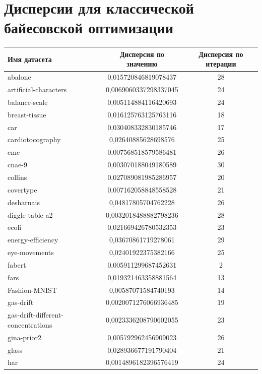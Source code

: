\documentclass[times,specification,annotation]{itmo-student-thesis}
\begin{document}
\chapter{Дисперсии для классической байесовской оптимизации}\label{app:сbo-disp}
\begin{center} 
	\begin{longtable}{ |m{5cm}|c|c| } 
		\hline
		\textbf{Имя датасета} & \textbf{Дисперсия по значению} & \textbf{Дисперсия по итерации} \\
		\hline\hline
		abalone & 0,015720846819078437 & 28 \\
		\hline
		artificial-characters & 0,0069060337298337045 & 24 \\
		\hline
		balance-scale & 0,005114884116420693 & 24 \\
		\hline
		breast-tissue & 0,016125763125763116 & 18 \\
		\hline
		car & 0,030408332830185746 & 17 \\
		\hline
		cardiotocography & 0,02640885628698576 & 25 \\
		\hline
		cmc & 0,007568518579586481 & 26 \\
		\hline
		cnae-9 & 0,003070188049180589 & 30 \\
		\hline
		collins & 0,027089081985286957 & 20 \\
		\hline
		covertype & 0,007162058848558528 & 21 \\
		\hline
		desharnais & 0,04817805704762228 & 26 \\
		\hline
		diggle-table-a2 & 0,0032018488882798236 & 28 \\
		\hline
		ecoli & 0,021669426780532353 & 23 \\
		\hline
		energy-efficiency & 0,03670861719278061 & 29 \\
		\hline
		eye-movements & 0,02401922375382166 & 25 \\
		\hline
		fabert & 0,005911299687452631 & 2 \\
		\hline
		fars & 0,019321463358881564 & 13 \\
		\hline
		Fashion-MNIST & 0,00587071584740193 & 14 \\
		\hline
		gas-drift & 0,0020071276066936485 & 19 \\
		\hline
		gas-drift-different-concentrations & 0,0023336208790602055 & 23 \\
		\hline
		gina-prior2 & 0,005792962456909023 & 26 \\
		\hline
		glass & 0,028936677191790404 & 21 \\
		\hline
		har & 0,0014896182396576419 & 24 \\

\end{longtable}
\end{center}
\end{document}
